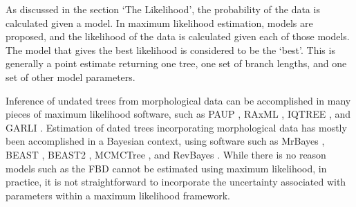 \documentclass[11pt]{article}
\makeatletter
\newenvironment{boxedtext}[1]{%
  \begin{mdframed}[frametitle=#1,
    frametitlefont=\scshape\mdseries\sffamily,
    frametitlealignment=\centering,
    backgroundcolor=black!20,
    hidealllines=true,
    innerleftmargin=11\p@,innerrightmargin=11\p@,
    frametitleaboveskip=0.5\baselineskip,
    innerbottommargin=0.5\baselineskip,
    skipabove=\baselineskip,skipbelow=0.5\baselineskip]
}{%
  \end{mdframed}%
}
\makeatother
\begin{document}
\clearpage

\begin{boxedtext}{Box 3. Maximum Likelihood and Bayesian Estimation}


As discussed in the section `The Likelihood', the probability of the data is calculated given a model. 
In maximum likelihood estimation, models are proposed, and the likelihood of the data is calculated given each of those models.
The model that gives the best likelihood is considered to be the `best'.
This is generally a point estimate returning one tree, one set of branch lengths, and one set of other model parameters.

Inference of undated trees from morphological data can be accomplished in many pieces of maximum likelihood software, such as PAUP \citep{Swofford2003}, RAxML \citep{Stamatakis2014}, IQTREE \citep{IQtree}, and GARLI \cite{zwickl2006}.
Estimation of dated trees incorporating morphological data has mostly been accomplished in a Bayesian context, using software such as MrBayes \cite{Huelsenbeck2002, Ronquist2003}, BEAST \citep{BEAST}, BEAST2 \citep{BEAST2} , MCMCTree \citep{MCMCtree}, and RevBayes \citep{Hoehna2014b, Hoehna2016b}.
While there is no reason models such as the FBD cannot be estimated using maximum likelihood, in practice, it is not straightforward to incorporate the uncertainty associated with parameters within a maximum likelihood framework.
\end{boxedtext}

\clearpage
\end{document}
